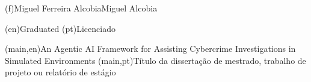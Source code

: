 %
 \ncauthorname(f){Miguel Ferreira Alcobia}{Miguel Alcobia}



\ncauthordegree(en){Graduated} 
\ncauthordegree(pt){Licenciado}

\nctitle(main,en){An Agentic AI Framework for Assisting Cybercrime Investigations in Simulated Environments}
\nctitle(main,pt){Título da dissertação de mestrado, trabalho de projeto ou relatório de estágio}

